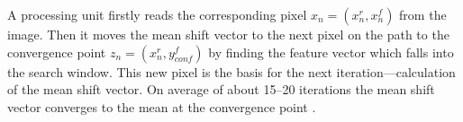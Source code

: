 A processing unit firstly reads the corresponding pixel $x_n = (x_n^r, x_n^f)$
from the image. Then it moves the mean shift vector to the next pixel on the 
path to the convergence point $z_n = (x_n^r, y_{conf}^f)$ by finding the feature
vector which falls into the search window. This new pixel  is the basis for the
next iteration---calculation of the mean shift vector. On average of about
15--20 iterations the mean shift vector converges to the mean at the convergence
point \citep{DBLP:conf/eccv/ZhangKT06}. 







 

























